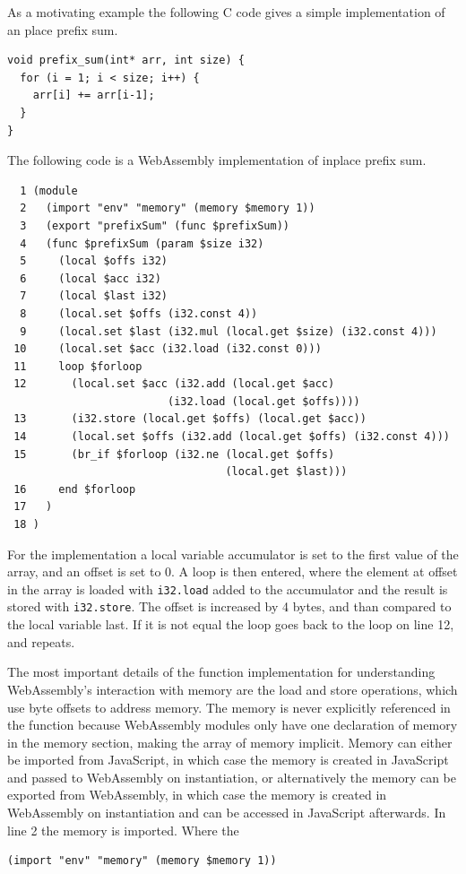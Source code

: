 \documentclass[11pt]{book}
\begin{document}
As a motivating example the following C code gives a simple implementation of an place prefix sum.

\begin{verbatim}
void prefix_sum(int* arr, int size) {
  for (i = 1; i < size; i++) {
    arr[i] += arr[i-1];
  }
}
\end{verbatim}
The following code is a WebAssembly implementation of inplace prefix sum.
\begin{verbatim}
  1 (module
  2   (import "env" "memory" (memory $memory 1))
  3   (export "prefixSum" (func $prefixSum))
  4   (func $prefixSum (param $size i32)
  5     (local $offs i32)
  6     (local $acc i32)
  7     (local $last i32)
  8     (local.set $offs (i32.const 4))
  9     (local.set $last (i32.mul (local.get $size) (i32.const 4)))
 10     (local.set $acc (i32.load (i32.const 0)))
 11     loop $forloop
 12       (local.set $acc (i32.add (local.get $acc) 
                         (i32.load (local.get $offs))))
 13       (i32.store (local.get $offs) (local.get $acc))
 14       (local.set $offs (i32.add (local.get $offs) (i32.const 4)))
 15       (br_if $forloop (i32.ne (local.get $offs) 
                                  (local.get $last)))
 16     end $forloop
 17   )
 18 )
\end{verbatim}

For the implementation a local variable accumulator is set to the first value of the array, and an offset is set to 0. A loop is then entered, where the element at offset in the array is loaded with \texttt{i32.load} added to the accumulator and the result is stored with \texttt{i32.store}. The offset is increased by 4 bytes, and than compared to the local variable last. If it is not equal the loop goes back to the loop on line 12, and repeats.

The most important details of the function implementation for understanding WebAssembly's interaction with memory are the load and store operations, which use byte offsets to address memory. The memory is never explicitly referenced in the function because WebAssembly modules only have one declaration of memory in the memory section, making the array of memory implicit. Memory can either be imported from JavaScript, in which case the memory is created in JavaScript and passed to WebAssembly on instantiation, or alternatively the memory can be exported from WebAssembly, in which case the memory is created in WebAssembly on instantiation and can be accessed in JavaScript afterwards. In line 2 the memory is imported. Where the 
\begin{verbatim}
(import "env" "memory" (memory $memory 1))
\end{verbatim}
\end{document}
